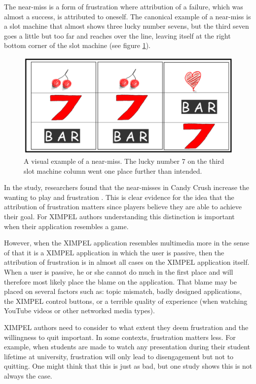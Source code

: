 The near-miss is a form of frustration where attribution of a failure, which was almost a success, is attributed to oneself. The canonical example of a near-miss is a slot machine that almost shows three lucky number sevens, but the third seven goes a little but too far and reaches over the line, leaving itself at the right bottom corner of the slot machine (see figure \ref{fig:near_miss}). 

\begin{figure}
    \centering
    \includegraphics[width=1.35\textwidth, center]{near_miss.png} %
    \caption{A visual example of a near-miss. The lucky number 7 on the third slot machine column went one place further than intended.}
    \label{fig:near_miss}
\end{figure}

In the study, researchers found that the near-misses in Candy Crush increase the wanting to play and frustration \cite{larche2017}. This is clear evidence for the idea that the attribution of frustration matters since players believe they are able to achieve their goal. For XIMPEL authors understanding this distinction is important when their application resembles a game.

However, when the XIMPEL application resembles multimedia more in the sense of that it is a XIMPEL application in which the user is passive, then the attribution of frustration is in almost all cases on the XIMPEL application itself. When a user is passive, he or she cannot do much in the first place and will therefore most likely place the blame on the application. That blame may be placed on several factors such as: topic mismatch, badly designed applications, the XIMPEL control buttons, or a terrible quality of experience (when watching YouTube videos or other networked media types).

XIMPEL authors need to consider to what extent they deem frustration and the willingness to quit important. In some contexts, frustration matters less. For example, when students are made to watch any presentation during their student lifetime at university, frustration will only lead to disengagement but not to quitting. One might think that this is just as bad, but one study shows this is not always the case. 

